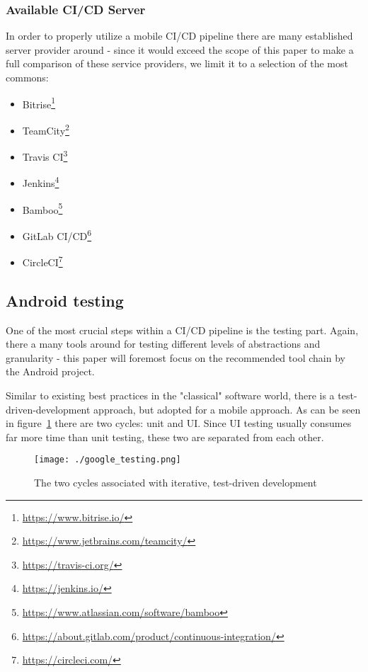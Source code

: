 \subsubsection{Available CI/CD Server}

In order to properly utilize a mobile CI/CD pipeline there are many established server provider around - since it would exceed the scope of this paper to make a full comparison of these service providers, we limit it to a selection of the most commons:

\begin{itemize}
	\item Bitrise\footnote{\url{https://www.bitrise.io/}}
	\item TeamCity\footnote{\url{https://www.jetbrains.com/teamcity/}}
	\item Travis CI\footnote{\url{https://travis-ci.org/}}
	\item Jenkins\footnote{\url{https://jenkins.io/}}
	\item Bamboo\footnote{\url{https://www.atlassian.com/software/bamboo}}
	\item GitLab CI/CD\footnote{\url{https://about.gitlab.com/product/continuous-integration/}}
	\item CircleCI\footnote{\url{https://circleci.com/}}
\end{itemize}

\subsection{Android testing}
One of the most crucial steps within a CI/CD pipeline is the testing part. Again, there a many tools around for testing different levels of abstractions and granularity - this paper will foremost focus on the recommended tool chain by the Android project.~\cite{doc:fundamental_testing}

Similar to existing best practices in the "classical" software world, there is a test-driven-development approach, but adopted for a mobile approach. As can be seen in figure~\ref{fig_google_testing} there are two cycles: unit and UI. Since UI testing usually consumes far more time than unit testing, these two are separated from each other.

\begin{figure}[h]
	\centering
	\texttt{[image: ./google\_testing.png]}
	\caption[The two cycles associated with iterative, test-driven development]{The two cycles associated with iterative, test-driven development\footnotemark}
	\label{fig_google_testing}
\end{figure}

